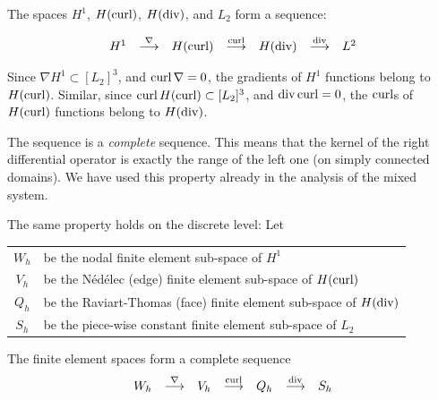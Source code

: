 The spaces $H^1$, $H(\operatorname{curl})$, $H(\operatorname{div})$, and $L_2$ form a sequence:

$$
\begin{array}{ccccccc}
H^1             &      \stackrel{\nabla}{\longrightarrow}          &
H(\operatorname{curl})      &      \stackrel{\operatorname{curl}}{\longrightarrow}   &
H(\operatorname{div})       &      \stackrel{\operatorname{div}}{\longrightarrow}    & 
L^2                                                                                    
\end{array}
$$

Since $\nabla H^1 \subset [L_2]^3$, and $\operatorname{curl} \nabla = 0$, the gradients 
of $H^1$ functions belong to $H(\operatorname{curl})$. 
Similar, since $\operatorname{curl} H(\operatorname{curl}) \subset [L_2]^3$, and $\operatorname{div} \operatorname{curl} = 0$, 
the $\operatorname{curl}$s of $H(\operatorname{curl})$ functions belong to $H(\operatorname{div})$.

The sequence is a {\em complete} sequence. This means that the kernel of the right
differential operator is exactly the range of the left one (on simply connected domains). 
We have used this property
already in the analysis of the mixed system.

The same property holds on the discrete level: Let \\
\begin{center}
\begin{tabular}{cl}
$W_h$ & be the nodal finite element sub-space  of $H^1$ \\
$V_h$ & be the N\'ed\'elec (edge) finite element sub-space of $H(\operatorname{curl})$ \\
$Q_h$ & be the Raviart-Thomas (face) finite element sub-space of $H(\operatorname{div})$ \\
$S_h$ & be the piece-wise constant finite element sub-space of $L_2$
\end{tabular}
\end{center}

\begin{theorem}
The finite element spaces form a complete sequence
$$
\begin{array}{ccccccc}
W_h             &      \stackrel{\nabla}{\longrightarrow}          &
V_h             &      \stackrel{\operatorname{curl}}{\longrightarrow}   &
Q_h             &      \stackrel{\operatorname{div}}{\longrightarrow}    & 
S_h                                                                                    
\end{array}
$$
\end{theorem}


